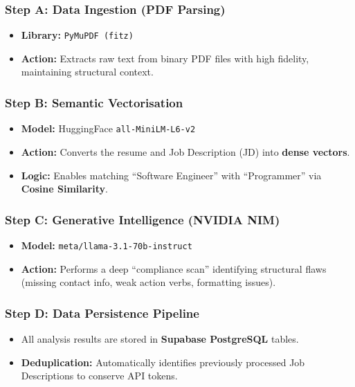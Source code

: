 \documentclass[12pt, a4paper]{article}
\newcommand{\code}[1]{\texttt{\small #1}}
\begin{document}
\subsubsection*{Step A: Data Ingestion (PDF Parsing)}
\begin{itemize}[noitemsep]
    \item \textbf{Library:} \code{PyMuPDF (fitz)}
    \item \textbf{Action:} Extracts raw text from binary PDF files with high fidelity, maintaining structural context.
\end{itemize}

\subsubsection*{Step B: Semantic Vectorisation}
\begin{itemize}[noitemsep]
    \item \textbf{Model:} HuggingFace \code{all-MiniLM-L6-v2}
    \item \textbf{Action:} Converts the resume and Job Description (JD) into \textbf{dense vectors}.
    \item \textbf{Logic:} Enables matching ``Software Engineer'' with ``Programmer'' via \textbf{Cosine Similarity}.
\end{itemize}

\subsubsection*{Step C: Generative Intelligence (NVIDIA NIM)}
\begin{itemize}[noitemsep]
    \item \textbf{Model:} \code{meta/llama-3.1-70b-instruct}
    \item \textbf{Action:} Performs a deep ``compliance scan'' identifying structural flaws (missing contact info, weak action verbs, formatting issues).
\end{itemize}

\subsubsection*{Step D: Data Persistence Pipeline}
\begin{itemize}[noitemsep]
    \item All analysis results are stored in \textbf{Supabase PostgreSQL} tables.
    \item \textbf{Deduplication:} Automatically identifies previously processed Job Descriptions to conserve API tokens.
\end{itemize}
\end{document}
